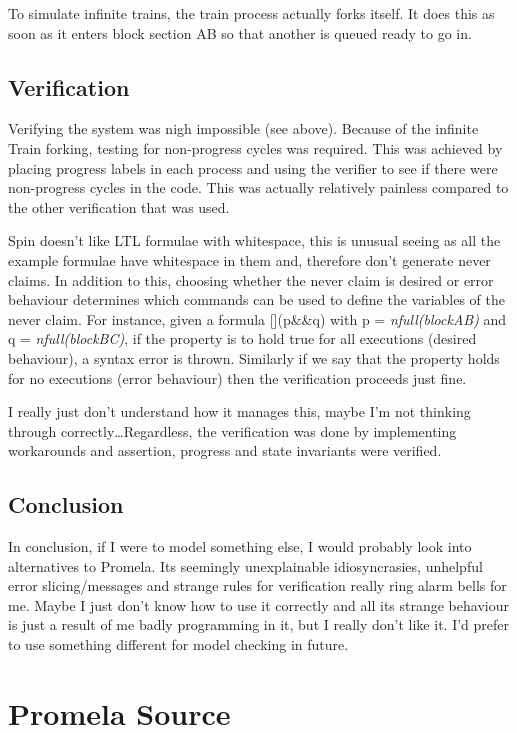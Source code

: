 \documentclass[10pt]{article}
\begin{document}
    To simulate infinite trains, the train process actually forks itself. It
    does this as soon as it enters block section AB so that another is queued
    ready to go in.
   
    \subsection{Verification}
    Verifying the system was nigh impossible (see above). Because of the infinite
    Train forking, testing for non-progress cycles was required. This was achieved
    by placing progress labels in each process and using the verifier to see if there
    were non-progress cycles in the code. This was actually relatively painless
    compared to the other verification that was used.

    Spin doesn't like LTL formulae with whitespace, this is unusual seeing as all
    the example formulae have whitespace in them and, therefore don't generate
    never claims. In addition to this, choosing whether the never claim is
    desired or error behaviour determines which commands can be used to define
    the variables of the never claim. For instance, given a formula [](p\&\&q)
    with p = \emph{nfull(blockAB)} and q = \emph{nfull(blockBC)}, if the property
    is to hold true for all executions (desired behaviour), a syntax error is
    thrown. Similarly if we say that the property holds for no executions
    (error behaviour) then the verification proceeds just fine.
   
    I really just don't understand how it manages this, maybe I'm not thinking
    through correctly\ldots Regardless, the verification was done by
    implementing workarounds and assertion, progress and state invariants were
    verified.         
 
    \subsection{Conclusion}
      In conclusion, if I were to model something else, I would probably look into
      alternatives to Promela. Its seemingly unexplainable idiosyncrasies, unhelpful
      error slicing/messages and strange rules for verification really ring
      alarm bells for me. Maybe I just don't know how to use it correctly and
      all its strange behaviour is just a result of me badly programming in it,
      but I really don't like it. I'd prefer to use something different for
      model checking in future.
       
  \section{Promela Source}
   
\end{document}
